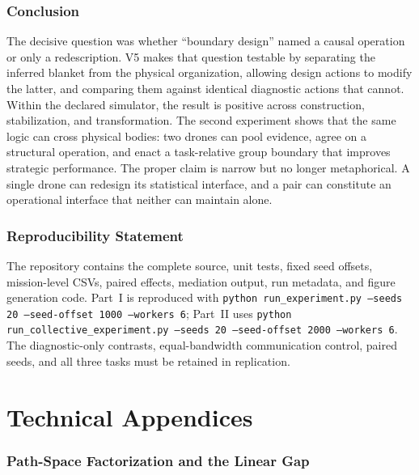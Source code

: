 \documentclass[11pt,a4paper]{article}
\numberwithin{equation}{section}
\begin{document}
\section{Conclusion}

The decisive question was whether ``boundary design'' named a causal
operation or only a redescription. V5 makes that question testable by
separating the inferred blanket from the physical organization, allowing
design actions to modify the latter, and comparing them against identical
diagnostic actions that cannot. Within the declared simulator, the result is
positive across construction, stabilization, and transformation. The second
experiment shows that the same logic can cross physical bodies: two drones
can pool evidence, agree on a structural operation, and enact a task-relative
group boundary that improves strategic performance. The proper claim is
narrow but no longer metaphorical. A single drone can redesign its
statistical interface, and a pair can constitute an operational interface
that neither can maintain alone.

\section*{Reproducibility Statement}

The repository contains the complete source, unit tests, fixed seed offsets,
mission-level CSVs, paired effects, mediation output, run metadata, and figure
generation code. Part~I is reproduced with
\texttt{python run\_experiment.py --seeds 20 --seed-offset 1000 --workers 6};
Part~II uses
\texttt{python run\_collective\_experiment.py --seeds 20 --seed-offset 2000
--workers 6}. The diagnostic-only contrasts, equal-bandwidth communication
control, paired seeds, and all three tasks must be retained in replication.

\appendix
\part*{Technical Appendices}

\section{Path-Space Factorization and the Linear Gap}
\end{document}
